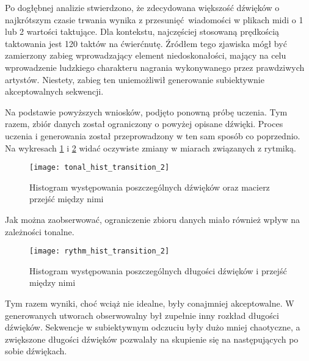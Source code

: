 {{        \bigskip

        Po dogłębnej analizie stwierdzono, że zdecydowana większość dźwięków o najkrótszym czasie trwania
        wynika z\,\,przesunięć wiadomości w\,\,plikach midi o\,\,1 lub 2 wartości taktujące. Dla kontekstu, najczęściej stosowaną
        prędkością taktowania jest 120 taktów na ćwierćnutę. Źródłem tego zjawiska mógł być zamierzony 
        zabieg wprowadzający element niedoskonałości, mający na celu wprowadzenie ludzkiego charakteru nagrania 
        wykonywanego przez prawdziwych artystów.
        Niestety, zabieg ten uniemożliwił generowanie subiektywnie akceptowalnych sekwencji.

        Na podstawie powyższych wniosków, podjęto ponowną próbę uczenia. Tym razem, zbiór danych został
        ograniczony o\,\,powyżej opisane dźwięki. Proces uczenia i\,\,generowania został przeprowadzony w\,\,ten sam sposób
        co poprzednio. 
        Na wykresach \ref{tonal_hist_transition_2} i \ref{rythm_hist_transition_2} widać oczywiste zmiany w\,\,miarach związanych z\,\,rytmiką. 

        \begin{figure}
            \centering
            \texttt{[image: tonal\_hist\_transition\_2]}
            \caption{Histogram występowania poszczególnych dźwięków oraz macierz przejść między nimi}
            \label{tonal_hist_transition_2}
        \end{figure}

        Jak można zaobserwować, ograniczenie zbioru danych miało również wpływ na zależności tonalne.

        \begin{figure}
            \centering
            \texttt{[image: rythm\_hist\_transition\_2]}
            \caption{Histogram występowania poszczególnych długości dźwięków i\,\,przejść między nimi}
            \label{rythm_hist_transition_2}
        \end{figure}

        \bigskip

        Tym razem wyniki, choć wciąż nie idealne, były conajmniej akceptowalne. 
        W\,\,generowanych utworach
        obserwowalny był zupełnie inny rozkład długości dźwięków. Sekwencje w\,\,subiektywnym odczuciu były dużo mniej
        chaotyczne, a\,\,zwiększone długości dźwięków pozwalały na skupienie się na następujących po sobie dźwiękach.
        
}}
